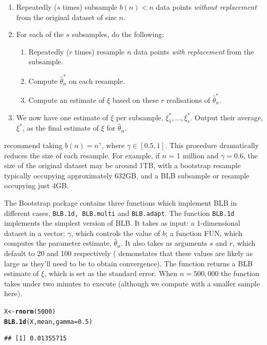 \documentclass{article}\usepackage[]{graphicx}\usepackage[]{color}
\makeatletter
\newcommand{\hlnum}[1]{\textcolor[rgb]{0.686,0.059,0.569}{#1}}%
\newcommand{\hlstd}[1]{\textcolor[rgb]{0.345,0.345,0.345}{#1}}%
\newcommand{\hlkwb}[1]{\textcolor[rgb]{0.69,0.353,0.396}{#1}}%
\newcommand{\hlkwc}[1]{\textcolor[rgb]{0.333,0.667,0.333}{#1}}%
\newcommand{\hlkwd}[1]{\textcolor[rgb]{0.737,0.353,0.396}{\textbf{#1}}}%
\newenvironment{kframe}{%
 \def\at@end@of@kframe{}%
 \ifinner\ifhmode%
  \def\at@end@of@kframe{\end{minipage}}%
  \begin{minipage}{\columnwidth}%
 \fi\fi%
 \def\FrameCommand##1{\hskip\@totalleftmargin \hskip-\fboxsep
 \colorbox{shadecolor}{##1}\hskip-\fboxsep
     \hskip-\linewidth \hskip-\@totalleftmargin \hskip\columnwidth}%
 \MakeFramed {\advance\hsize-\width
   \@totalleftmargin\z@ \linewidth\hsize
   \@setminipage}}%
 {\par\unskip\endMakeFramed%
 \at@end@of@kframe}
\newenvironment{knitrout}{}{} %
\makeatother
\begin{document}
\begin{enumerate}
\item Repeatedly ($s$ times) subsample $b(n) < n$ data points \emph{without replacement} from the original dataset of size $n$.
\item For each of the $s$ subsamples, do the following:
\begin{enumerate}
\item Repeatedly ($r$ times) resample $n$ data points \emph{with replacement} from the subsample.
\item Compute $\hat\theta_n^*$ on each resample.
\item Compute an estimate of $\xi$ based on these $r$ realisations of $\hat\theta_n^*$.
\end{enumerate}
\item We now have one estimate of $\xi$ per subsample, $\xi^*_1, \ldots, \xi^*_s$. Output their average, $\xi^*$, as the final estimate of $\xi$ for $\hat\theta_n$.
\end{enumerate}


\textcite{Kleiner2014} recommend taking $b(n) = n^{\gamma}$, where $\gamma \in [0.5,1]$. This procedure dramatically reduces the size of each resample. For example, if $n$ = 1 million and $\gamma=0.6$, the size of the original dataset may be around 1TB, with a bootstrap resample typically occupying approximately 632GB, and a BLB subsample or resample occupying just 4GB.

The Bootstrap package contains three functions which implement BLB in different cases, \texttt{BLB.1d, BLB.multi} and \texttt{BLB.adapt}. The function \texttt{BLB.1d} implements the simplest version of BLB. It takes as input: a 1-dimensional dataset in a vector; $\gamma$, which controls the value of $b$; a function FUN, which computes the parameter estimate, $\hat\theta_n$. It also takes as arguments $s$ and $r$, which default to 20 and 100 respectively (\textcite{Kleiner2014} demonstates that these values are likely as large as they'll need to be to obtain convergence). The function returns a BLB estimate of $\xi$, which is set as the standard error. When $n=500,000$ the function takes under two minutes to execute (although we compute with a smaller sample here).

\begin{knitrout}
\color{fgcolor}\begin{kframe}
\begin{alltt}
\hlstd{X} \hlkwb{<-} \hlkwd{rnorm}\hlstd{(}\hlnum{5000}\hlstd{)}
\hlkwd{BLB.1d}\hlstd{(X, mean,} \hlkwc{gamma}\hlstd{=}\hlnum{0.5}\hlstd{)}
\end{alltt}
\begin{verbatim}
## [1] 0.01355715
\end{verbatim}
\end{kframe}
\end{knitrout}
\end{document}
